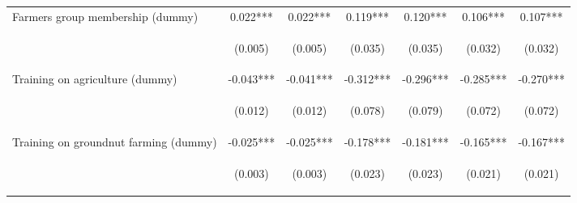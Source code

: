 \begin{center}
\begin{tabular}{lcccccc}
Farmers group membership (dummy) & 0.022*** & 0.022*** & 0.119*** & 0.120*** & 0.106*** & 0.107*** \\
\vspace{4pt} & \begin{footnotesize}(0.005)\end{footnotesize} & \begin{footnotesize}(0.005)\end{footnotesize} & \begin{footnotesize}(0.035)\end{footnotesize} & \begin{footnotesize}(0.035)\end{footnotesize} & \begin{footnotesize}(0.032)\end{footnotesize} & \begin{footnotesize}(0.032)\end{footnotesize} \\
Training on agriculture (dummy) & -0.043*** & -0.041*** & -0.312*** & -0.296*** & -0.285*** & -0.270*** \\
\vspace{4pt} & \begin{footnotesize}(0.012)\end{footnotesize} & \begin{footnotesize}(0.012)\end{footnotesize} & \begin{footnotesize}(0.078)\end{footnotesize} & \begin{footnotesize}(0.079)\end{footnotesize} & \begin{footnotesize}(0.072)\end{footnotesize} & \begin{footnotesize}(0.072)\end{footnotesize} \\
Training on groundnut farming (dummy) & -0.025*** & -0.025*** & -0.178*** & -0.181*** & -0.165*** & -0.167*** \\
\vspace{4pt} & \begin{footnotesize}(0.003)\end{footnotesize} & \begin{footnotesize}(0.003)\end{footnotesize} & \begin{footnotesize}(0.023)\end{footnotesize} & \begin{footnotesize}(0.023)\end{footnotesize} & \begin{footnotesize}(0.021)\end{footnotesize} & \begin{footnotesize}(0.021)\end{footnotesize} \\

\end{tabular}
\end{center}
